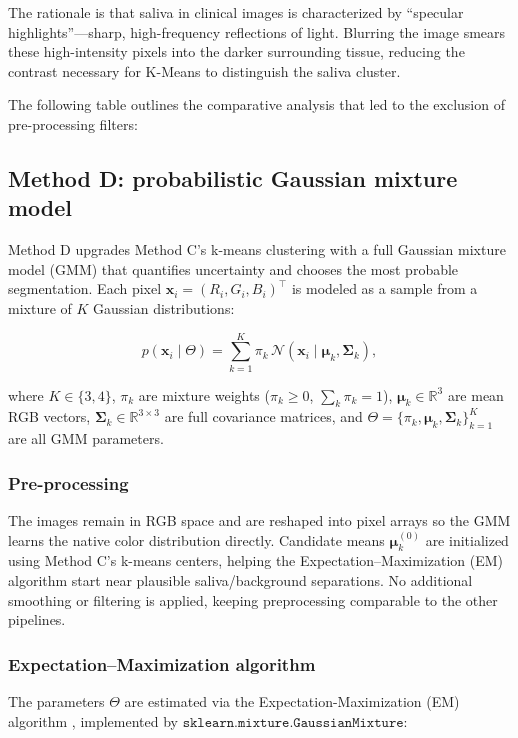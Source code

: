 The rationale is that saliva in clinical images is characterized by ``specular highlights''---sharp, high-frequency reflections of light. Blurring the image smears these high-intensity pixels into the darker surrounding tissue, reducing the contrast necessary for K-Means to distinguish the saliva cluster.

The following table outlines the comparative analysis that led to the exclusion of pre-processing filters:

\subsection{Method D: probabilistic Gaussian mixture model}

Method D upgrades Method C's k-means clustering with a full Gaussian mixture model (GMM) that quantifies uncertainty and chooses the most probable segmentation. Each pixel \(\mathbf{x}_i = (R_i, G_i, B_i)^\top\) is modeled as a sample from a mixture of \(K\) Gaussian distributions:

\[
  p(\mathbf{x}_i \mid \Theta) = \sum_{k=1}^{K} \pi_k \, \mathcal{N}(\mathbf{x}_i \mid \boldsymbol{\mu}_k, \boldsymbol{\Sigma}_k),
\]

where \(K \in \{3,4\}\), \(\pi_k\) are mixture weights (\(\pi_k \ge 0\), \(\sum_k \pi_k = 1\)), \(\boldsymbol{\mu}_k \in \mathbb{R}^3\) are mean RGB vectors, \(\boldsymbol{\Sigma}_k \in \mathbb{R}^{3 \times 3}\) are full covariance matrices, and \(\Theta = \{\pi_k, \boldsymbol{\mu}_k, \boldsymbol{\Sigma}_k\}_{k=1}^K\) are all GMM parameters.

\subsubsection{Pre-processing}

The images remain in RGB space and are reshaped into pixel arrays so the GMM learns the native color distribution directly. Candidate means \(\boldsymbol{\mu}_k^{(0)}\) are initialized using Method C's k-means centers, helping the Expectation–Maximization (EM) algorithm start near plausible saliva/background separations. No additional smoothing or filtering is applied, keeping preprocessing comparable to the other pipelines.

\subsubsection{Expectation–Maximization algorithm}

The parameters \(\Theta\) are estimated via the Expectation-Maximization (EM) algorithm \cite{dempster1977maximum}, implemented by \(\texttt{sklearn.mixture.GaussianMixture}\):

